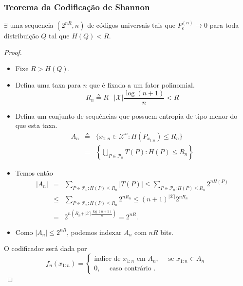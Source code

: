\begin{frame}[allowframebreaks]
  \frametitle{Teorema da Codificação de Shannon}
  \begin{theorem}
  $\exists$ uma sequencia $(2^{nR},n)$ de códigos universais tais que $P_e^{(n)} \rightarrow 0$ para toda
  distribuição $Q$ tal que $H(Q) < R$.
  \end{theorem}

  \framebreak 

  \begin{proof}
  \begin{itemize}
  \item Fixe $R > H(Q)$.
  \item Defina uma taxa para $n$ que é fixada a um fator polinomial.
	\begin{equation}
	R_n \triangleq R - \vert \mathcal{X} \vert \frac{\log (n+1)}{n} < R
	\end{equation}
  \item Defina um conjunto de sequências que possuem entropia de tipo menor do que esta taxa.
	\begin{eqnarray}
	A_n &\triangleq& \{ x_{1:n} \in \mathcal{X}^n : H(P_{x_{1:n}}) \leq R_n \} \nonumber \\
		&=& \left\{  \bigcup_{P \in \mathcal{P}_n} T(P) : H(P) \leq R_n \right\}
	\end{eqnarray}
  \end{itemize}
 
  \proofbreak

  \begin{itemize}
  \item Temos então
  \begin{eqnarray}
	\vert A_n \vert &=& \sum_{P \in \mathcal{P}_n : H(P) \leq R_n} \vert T(P) \vert \leq \sum_{P \in \mathcal{P}_n : H(P) \leq R_n} 2^{nH(P)} \nonumber \\
			&\leq& \sum_{P \in \mathcal{P}_n : H(P) \leq R_n} 2^{nR_n} \leq (n+1)^{\vert \mathcal{X} \vert} 2^{nR_n} \nonumber \\
			&=& 2^{n \left( R_n + \vert \mathcal{X} \vert \frac{\log (n+1)}{n} \right)} = 2^{nR} .
  \end{eqnarray}
  \item Como $\vert A_n \vert \leq 2^{nR}$, podemos indexar $A_n$ com $nR$ bits.
  \end{itemize}  

  \proofbreak

  O codificador será dada por
  \begin{equation}
  f_n (x_{1:n}) = \begin{cases} 
		\text{índice de } x_{1:n} \text{ em } A_n ,	\quad \text{ se } x_{1:n} \in A_n \\
		0					,	\quad \text{ caso contrário }.
		\end{cases}
  \end{equation}


\end{proof}
\end{frame}
